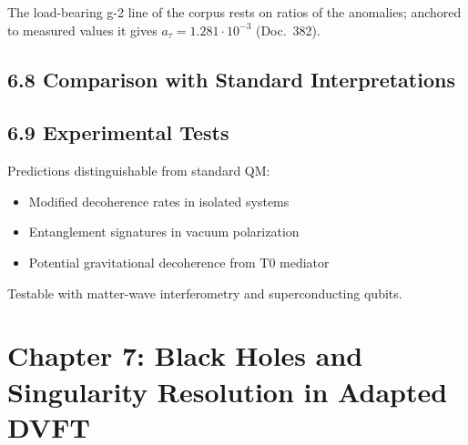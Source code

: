 	The load-bearing g-2 line of the corpus rests on ratios of the anomalies; anchored to measured values it gives $a_\tau = 1.281 \cdot 10^{-3}$ (Doc.~382).
	
	\subsection{6.8 Comparison with Standard Interpretations}
	
	\begin{table}[htbp]
		\centering
		\caption{Quantum interpretation comparison}
		\label{tab:quantum}
	\end{table}
	
	\subsection{6.9 Experimental Tests}
	
	Predictions distinguishable from standard QM:
	\begin{itemize}
		\item Modified decoherence rates in isolated systems
		\item Entanglement signatures in vacuum polarization
		\item Potential gravitational decoherence from T0 mediator
	\end{itemize}
	
	Testable with matter-wave interferometry and superconducting qubits.
	
	\section{Chapter 7: Black Holes and Singularity Resolution in Adapted DVFT}
	
